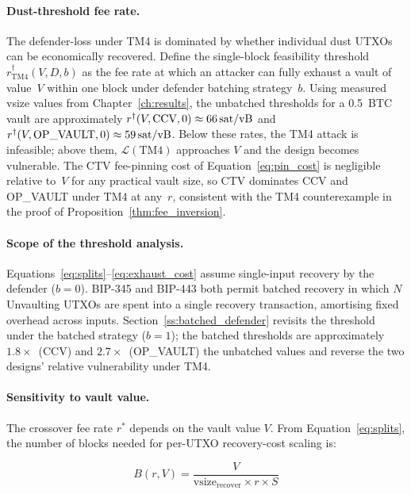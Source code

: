\paragraph{Dust-threshold fee rate.}
The defender-loss under TM4 is dominated by whether individual dust
UTXOs can be economically recovered. Define the single-block
feasibility threshold $r^\dagger_{\mathrm{TM4}}(V, D, b)$ as the fee
rate at which an attacker can fully exhaust a vault of value~$V$
within one block under defender batching strategy~$b$. Using measured
vsize values from Chapter~\ref{ch:results}, the unbatched thresholds
for a 0.5~BTC vault are approximately $r^\dagger(V, \mathrm{CCV}, 0)
\approx 66\,\text{sat/vB}$ and $r^\dagger(V, \mathrm{OP\_VAULT}, 0) \approx
59\,\text{sat/vB}$. Below these rates, the TM4 attack is infeasible; above
them, $\mathcal{L}(\mathrm{TM4})$ approaches $V$ and the design
becomes vulnerable. The CTV fee-pinning cost of
Equation~\ref{eq:pin_cost} is negligible relative to~$V$ for any
practical vault size, so CTV dominates CCV and OP\_VAULT under TM4 at
any~$r$, consistent with the TM4 counterexample in the proof of
Proposition~\ref{thm:fee_inversion}.

\paragraph{Scope of the threshold analysis.}
Equations~\ref{eq:splits}--\ref{eq:exhaust_cost} assume single-input
recovery by the defender ($b = 0$). BIP-345 and BIP-443 both permit
batched recovery in which $N$ Unvaulting UTXOs are spent into a
single recovery transaction, amortising fixed overhead across
inputs. Section~\ref{ss:batched_defender} revisits the threshold
under the batched strategy ($b = 1$); the batched thresholds are
approximately $1.8\times$~(CCV) and $2.7\times$~(OP\_VAULT) the
unbatched values and reverse the two designs' relative vulnerability
under TM4.

\paragraph{Sensitivity to vault value.}
The crossover fee rate $r^*$ depends on the vault value $V$. From
Equation~\ref{eq:splits}, the number of blocks needed for per-UTXO recovery-cost scaling is:

\begin{equation} \label{eq:blocks_exhaust}
B(r, V) = \frac{V}{\text{vsize}_{\text{recover}} \times r \times S}
\end{equation}

